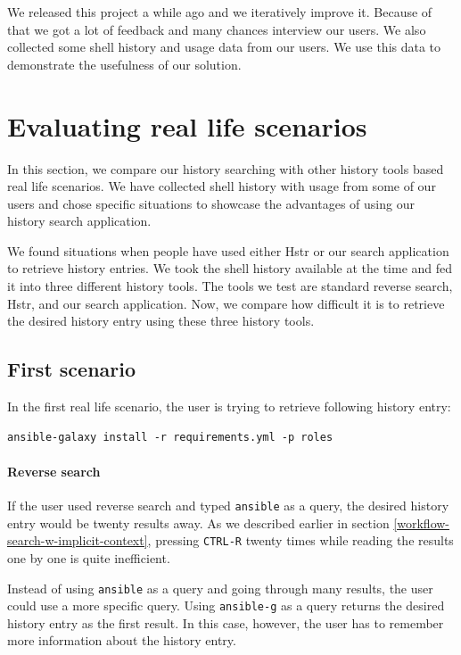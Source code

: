 We released this project a while ago and we iteratively improve it. Because of that we got a lot of feedback and many chances interview our users. We also collected some shell history and usage data from our users. We use this data to demonstrate the usefulness of our solution.

\section{Evaluating real life scenarios}


In this section, we compare our history searching with other history tools based real life scenarios. We have collected shell history with usage from some of our users and chose specific situations to showcase the advantages of using our history search application.

We found situations when people have used either Hstr\cite{toolshstr} or our search application to retrieve history entries. We took the shell history available at the time and fed it into three different history tools. The tools we test are standard reverse search, Hstr, and our search application. Now, we compare how difficult it is to retrieve the desired history entry using these three history tools.


\subsection{First scenario}

In the first real life scenario, the user is trying to retrieve following history entry: 

\begin{verbatim}
ansible-galaxy install -r requirements.yml -p roles
\end{verbatim}


\paragraph{Reverse search}
If the user used reverse search and typed \verb|ansible| as a query, the desired history entry would be twenty results away. As we described earlier in section  \ref{workflow-search-w-implicit-context}, pressing \verb|CTRL-R| twenty times while reading the results one by one is quite inefficient.

Instead of using \verb|ansible| as a query and going through many results, the user could use a more specific query. Using \verb|ansible-g| as a query returns the desired history entry as the first result. In this case, however, the user has to remember more information about the history entry.

